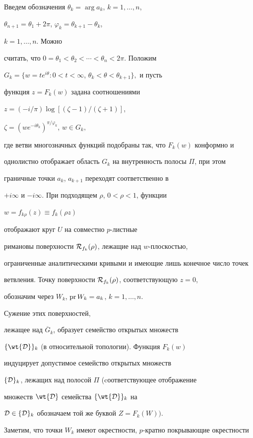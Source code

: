 \begin{pf}


Введем обозначения $\theta_k=\arg a_k$, $k=1,\dotsc,n$,


$\theta_{n+1}=\theta_1+2\pi$, $\varphi_k=\theta_{k+1}-\theta_k$,


$k=1,\dotsc,n.$ Можно


считать, что $0=\theta_1<\theta_2<\dotsb<\theta_n<2\pi.$ Положим


$G_k=\{w=te^{i\theta}:0<t<\infty$, $\theta_k<\theta<\theta_{k+1}\},$ и пусть


функция $z=F_k(w)$ задана соотношениями


$z=(-i/\pi)\log[(\zeta-1)/(\zeta+1)]$,


$\zeta=(we^{-i\theta_k})^{\pi/\varphi_k}$, $w\in G_k,$


где ветви многозначных функций подобраны так, что $F_k(w)$ конформно и


однолистно отображает область $G_k$ на внутренность полосы $\Pi$, при этом


граничные точки $a_k$, $a_{k+1}$ переходят соответственно в


$+i\infty$ и $-i\infty$. При подходящем $\rho$, $0<\rho<1$, функции


$w=f_{k\rho}(z)\equiv f_k(\rho z)$


отображают круг $U$ на совместно $p$-листные


римановы поверхности ${\cal R}_{f_k}(\rho)$, лежащие над $w$-плоскостью,


ограниченные аналитическими кривыми и имеющие лишь конечное число точек


ветвления. Точку поверхности ${\cal R}_{f_k}(\rho)$, соответствующую $z=0$,


обозначим через $W_k$, $\operatorname{pr} W_k=a_k$, $k=1,\dotsc,n.$


Сужение этих поверхностей,


лежащее над $\overline{G}_k$, образует семейство открытых множеств


$\{\wt{\cal D}\}_k$ (в относительной топологии). Функция $F_k(w)$


индуцирует допустимое семейство открытых множеств


$\{{\cal D}\}_k$, лежащих над полосой $\Pi$ (cоответствующее отображение


множеств $\wt{\cal D}$ семейства $\{\wt{\cal D}\}_k$ на


${\cal D}\in \{{\cal D}\}_k$ обозначаем той же буквой $Z=F_k(W))$.


Заметим, что точки $W_k$ имеют окрестности, $p$-кратно покрывающие окрестности



\end{pf}
